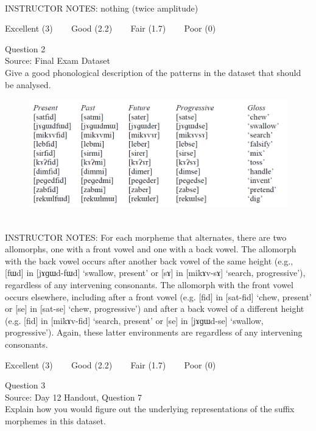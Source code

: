 \documentclass[12pt]{article}
\begin{document}
~\\
INSTRUCTOR NOTES: nothing (twice amplitude)


\vfill
Excellent (3) ~~~ Good (2.2) ~~~ Fair (1.7) ~~~ Poor (0)
\newpage

{\large Question 2}\\

Source: Final Exam Dataset\\

Give a good phonological description of the patterns in the dataset that should be analysed.\\

\begin{figure}[H]
\includegraphics{../images/final_dataset.png}
\end{figure}

~\\
INSTRUCTOR NOTES: For each morpheme that alternates, there are two allomorphs, one with a front vowel and one with a back vowel. The allomorph with the back vowel occurs after another back vowel of the same height (e.g., [fɯd] in [jɤɡɯd-fɯd] ‘swallow, present’ or [sɤ] in [mikɤv-sɤ] ‘search, progressive’), regardless of any intervening consonants. The allomorph with the front vowel occurs elsewhere, including after a front vowel (e.g. [fid] in [sat-fid] ‘chew, present’ or [se] in [sat-se] ‘chew, progressive’) and after a back vowel of a different height (e.g. [fid] in [mikɤv-fid] ‘search, present’ or [se] in [jɤɡɯd-se] ‘swallow, progressive’). Again, these latter environments are regardless of any intervening consonants.


\vfill
Excellent (3) ~~~ Good (2.2) ~~~ Fair (1.7) ~~~ Poor (0)
\newpage

{\large Question 3}\\

Source: Day 12 Handout, Question 7\\

Explain how you would figure out the underlying representations of the suffix morphemes in this dataset.\\
\end{document}
